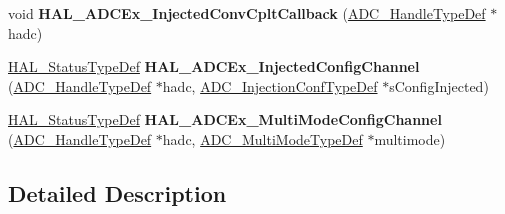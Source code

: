\begin{DoxyCompactItemize}
\item 
void {\bfseries H\+A\+L\+\_\+\+A\+D\+C\+Ex\+\_\+\+Injected\+Conv\+Cplt\+Callback} (\hyperlink{struct_a_d_c___handle_type_def}{A\+D\+C\+\_\+\+Handle\+Type\+Def} $\ast$hadc)\hypertarget{group___a_d_c_ex___exported___functions___group1_gaed7815e8b636ff1c1f456ecbaffe1942}{}\label{group___a_d_c_ex___exported___functions___group1_gaed7815e8b636ff1c1f456ecbaffe1942}

\item 
\hyperlink{stm32f4xx__hal__def_8h_a63c0679d1cb8b8c684fbb0632743478f}{H\+A\+L\+\_\+\+Status\+Type\+Def} {\bfseries H\+A\+L\+\_\+\+A\+D\+C\+Ex\+\_\+\+Injected\+Config\+Channel} (\hyperlink{struct_a_d_c___handle_type_def}{A\+D\+C\+\_\+\+Handle\+Type\+Def} $\ast$hadc, \hyperlink{struct_a_d_c___injection_conf_type_def}{A\+D\+C\+\_\+\+Injection\+Conf\+Type\+Def} $\ast$s\+Config\+Injected)\hypertarget{group___a_d_c_ex___exported___functions___group1_ga5736a78398eb51ddeb09dd83d1243045}{}\label{group___a_d_c_ex___exported___functions___group1_ga5736a78398eb51ddeb09dd83d1243045}

\item 
\hyperlink{stm32f4xx__hal__def_8h_a63c0679d1cb8b8c684fbb0632743478f}{H\+A\+L\+\_\+\+Status\+Type\+Def} {\bfseries H\+A\+L\+\_\+\+A\+D\+C\+Ex\+\_\+\+Multi\+Mode\+Config\+Channel} (\hyperlink{struct_a_d_c___handle_type_def}{A\+D\+C\+\_\+\+Handle\+Type\+Def} $\ast$hadc, \hyperlink{struct_a_d_c___multi_mode_type_def}{A\+D\+C\+\_\+\+Multi\+Mode\+Type\+Def} $\ast$multimode)\hypertarget{group___a_d_c_ex___exported___functions___group1_gabfe8b04f9cfda94bc8aad912470122f5}{}\label{group___a_d_c_ex___exported___functions___group1_gabfe8b04f9cfda94bc8aad912470122f5}

\end{DoxyCompactItemize}


\subsection{Detailed Description}
